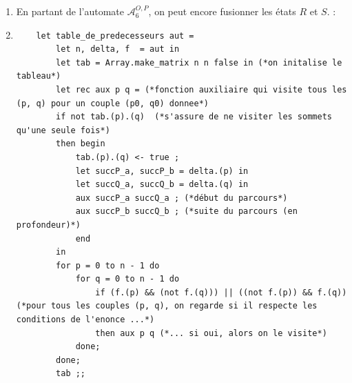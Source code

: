 \documentclass{article}
\begin{document}
\begin{enumerate}
    \item En partant de l'automate $\mathcal{A}_6^{O, P}$, on peut encore fusionner les états $R$ et $S$. \newline
     : \newline
    \begin{minipage}[t]{\linewidth}
        \centering
        \label{fig:fig4}
        \end{minipage}
    
    \item \label{itm:tabPredecesseurs} \begin{verbatim}
    let table_de_predecesseurs aut =
        let n, delta, f  = aut in 
        let tab = Array.make_matrix n n false in (*on initalise le tableau*)
        let rec aux p q = (*fonction auxiliaire qui visite tous les (p, q) pour un couple (p0, q0) donnee*)
        if not tab.(p).(q)  (*s'assure de ne visiter les sommets qu'une seule fois*)
        then begin
            tab.(p).(q) <- true ; 
            let succP_a, succP_b = delta.(p) in
            let succQ_a, succQ_b = delta.(q) in
            aux succP_a succQ_a ; (*début du parcours*)
            aux succP_b succQ_b ; (*suite du parcours (en profondeur)*)
            end
        in 
        for p = 0 to n - 1 do 
            for q = 0 to n - 1 do
                if (f.(p) && (not f.(q))) || ((not f.(p)) && f.(q)) (*pour tous les couples (p, q), on regarde si il respecte les conditions de l'enonce ...*)
                then aux p q (*... si oui, alors on le visite*)
            done;
        done;
        tab ;;
    \end{verbatim}


\end{enumerate}
\end{document}
